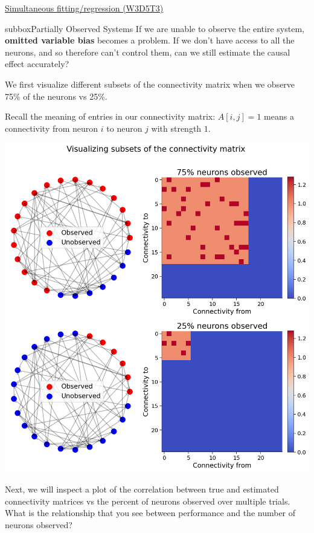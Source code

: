 \begin{textbox}{\href{https://compneuro.neuromatch.io/tutorials/W3D5_NetworkCausality/student/W3D5_Tutorial3.html}{Simultaneous fitting/regression (W3D5T3)}   }

\begin{subbox}{subbox}{Partially Observed Systems}
\scriptsize
If we are unable to observe the entire system, \textbf{omitted variable bias} becomes a problem. If we don't have access to all the neurons, and so therefore can't control them, can we still estimate the causal effect accurately?

We first visualize different subsets of the connectivity matrix when we observe 75\% of the neurons vs 25\%.

Recall the meaning of entries in our connectivity matrix: $A[i,j] = 1$ means a connectivity from neuron $i$ to neuron $j$ with strength $1$.
\begin{center}
    
\includegraphics[scale=0.24]{Figures/NC/NC_Figure15.png}

\end{center}

Next, we will inspect a plot of the correlation between true and estimated connectivity matrices vs the percent of neurons observed over multiple trials.
What is the relationship that you see between performance and the number of neurons observed?


\end{subbox}
\end{textbox}
